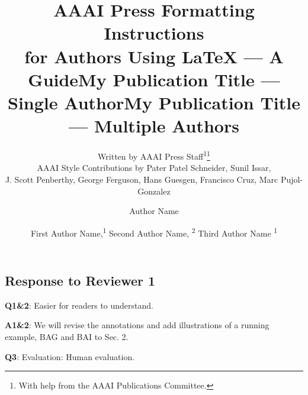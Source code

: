 \documentclass[letterpaper]{article} %
\title{AAAI Press Formatting Instructions \\for Authors Using \LaTeX{} --- A Guide}
\author{
    Written by AAAI Press Staff\textsuperscript{\rm 1}\thanks{With help from the AAAI Publications Committee.}\\
    AAAI Style Contributions by Pater Patel Schneider,
    Sunil Issar,\\
    J. Scott Penberthy,
    George Ferguson,
    Hans Guesgen,
    Francisco Cruz\equalcontrib,
    Marc Pujol-Gonzalez\equalcontrib
}
\title{My Publication Title --- Single Author}
\author {
    Author Name
}
\title{My Publication Title --- Multiple Authors}
\author {
    First Author Name,\textsuperscript{\rm 1}
    Second Author Name, \textsuperscript{\rm 2}
    Third Author Name \textsuperscript{\rm 1}
}
\begin{document}


\subsection*{Response to Reviewer 1}

\textbf{Q1\&2}: Easier for readers to understand.

\noindent 
\textbf{A1\&2}: 
We will revise the annotations
and add illustrations of a running example, BAG and BAI to Sec. 2.

\noindent 
\textbf{Q3}: Evaluation: Human evaluation.
\end{document}
